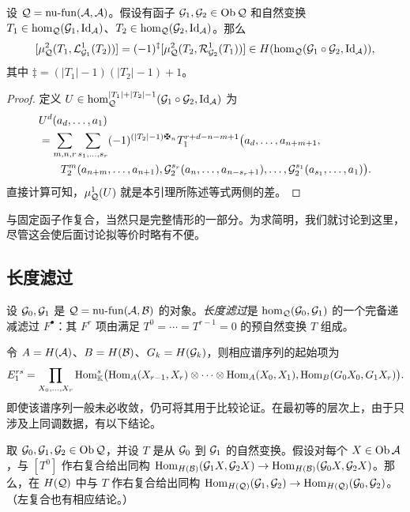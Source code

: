 \begin{lemma}\label{st:1.4}
设 $\mathcal Q=\operatorname{nu\text{-}fun}(\mathcal A,\mathcal A)$。假设有函子 $\mathcal G_1,\mathcal G_2\in\operatorname{Ob}\mathcal Q$ 和自然变换 $T_1\in\hom_{\mathcal Q}(\mathcal G_1,\operatorname{Id}_{\mathcal A})$、$T_2\in\hom_{\mathcal Q}(\mathcal G_2,\operatorname{Id}_{\mathcal A})$。那么
\[
[\mu^2_{\mathcal Q}(T_1,\mathcal L^1_{\mathcal G_1}(T_2))]
=(-1)^{\ddagger}[\mu^2_{\mathcal Q}(T_2,\mathcal R^1_{\mathcal G_2}(T_1))]
\in H(\hom_{\mathcal Q}(\mathcal G_1\circ\mathcal G_2,\operatorname{Id}_{\mathcal A})),
\]
其中 $\ddagger=(|T_1|-1)(|T_2|-1)+1$。
\end{lemma}
\begin{proof}
定义 $U\in\hom^{|T_1|+|T_2|-1}_{\mathcal Q}(\mathcal G_1\circ\mathcal G_2,\operatorname{Id}_{\mathcal A})$ 为
\[
\begin{aligned}
&U^d(a_d,\ldots,a_1)\\
&=\sum_{m,n,r}\sum_{s_1,\ldots,s_r}(-1)^{(|T_2|-1)\sgnmark_n}
T_1^{r+d-n-m+1}\bigl(a_d,\ldots,a_{n+m+1},\\
&\qquad T_2^m(a_{n+m},\ldots,a_{n+1}),
\G_2^{s_r}(a_n,\ldots,a_{n-s_r+1}),\ldots,\G_2^{s_1}(a_{s_1},\ldots,a_1)\bigr).
\end{aligned}
\]
直接计算可知，$\mu^1_{\mathcal Q}(U)$ 就是本引理所陈述等式两侧的差。
\end{proof}

\begin{note}\label{st:1.5}
与固定函子作复合，当然只是完整情形的一部分。为求简明，我们就讨论到这里，尽管这会使后面讨论拟等价时略有不便。
\end{note}

\clearpage
\subsection{长度滤过}\label{sec:1f}
\begin{definition*}
设 $\mathcal G_0,\mathcal G_1$ 是 $\mathcal Q=\operatorname{nu\text{-}fun}(\mathcal A,\mathcal B)$ 的对象。\emph{长度滤过}是 $\hom_{\mathcal Q}(\mathcal G_0,\mathcal G_1)$ 的一个完备递减滤过 $F^{\bullet}$：其 $F^r$ 项由满足 $T^0=\cdots=T^{r-1}=0$ 的预自然变换 $T$ 组成。
\end{definition*}

令 $A=H(\mathcal A)$、$B=H(\mathcal B)$、$G_k=H(\mathcal G_k)$，则相应谱序列的起始项为
\begin{equation}\label{eq:1.13}
E_1^{rs}=\prod_{X_0,\ldots,X_r}\operatorname{Hom}^s_{\mathbb K}\bigl(\operatorname{Hom}_A(X_{r-1},X_r)\otimes\cdots\otimes\operatorname{Hom}_A(X_0,X_1),\operatorname{Hom}_B(G_0X_0,G_1X_r)\bigr).
\end{equation}
即使该谱序列一般未必收敛，仍可将其用于比较论证。在最初等的层次上，由于只涉及上同调数据，有以下结论。

\begin{lemma}\label{st:1.6}
取 $\mathcal G_0,\mathcal G_1,\mathcal G_2\in\operatorname{Ob}\mathcal Q$，并设 $T$ 是从 $\mathcal G_0$ 到 $\mathcal G_1$ 的自然变换。假设对每个 $X\in\operatorname{Ob}\mathcal A$，与 $[T^0]$ 作右复合给出同构 $\operatorname{Hom}_{H(\mathcal B)}(\mathcal G_1X,\mathcal G_2X)\to\operatorname{Hom}_{H(\mathcal B)}(\mathcal G_0X,\mathcal G_2X)$。那么，在 $H(\mathcal Q)$ 中与 $T$ 作右复合给出同构 $\operatorname{Hom}_{H(\mathcal Q)}(\mathcal G_1,\mathcal G_2)\to\operatorname{Hom}_{H(\mathcal Q)}(\mathcal G_0,\mathcal G_2)$。（左复合也有相应结论。）
\end{lemma}

